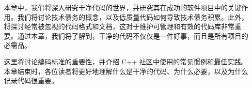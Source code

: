 本章中，我们将深入研究干净代码的世界，并研究其在成功的软件项目中的关键作用。我们将讨论技术债务的概念，以及低质量代码如何导致技术债务积累。此外，将探讨经常被忽视的代码格式和文档，这对于维护可管理和有效的代码库非常重要。通过本章，我们将了解到，干净的代码不仅仅是一件好事，而且是所有项目的必需品。

这里将讨论编码标准的重要性，并介绍 C++ 社区中使用的常见惯例和最佳实践。本章结束时，各位读者将更好地理解什么是干净的代码、为什么必要，以及为什么记录代码很重要。

